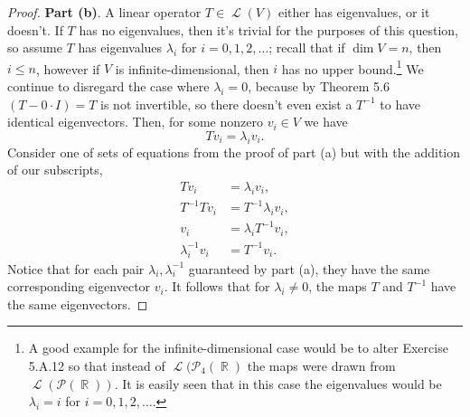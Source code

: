 \documentclass[letterpaper, 12pt]{amsart}
\DeclareMathOperator{\R}{\mathbb{R}}				%
\DeclareMathOperator{\Ell}{\mathscr{L}}				%
\theoremstyle{definition}  							%
\begin{document}
\begin{proof}
		\textbf{Part (b)}.
		A linear operator $T \in \Ell(V)$ either has eigenvalues, or it doesn't.
		If $T$ has no eigenvalues, then it's trivial for the purposes of this question, so assume $T$ has eigenvalues $\lambda_{i}$ for $i = 0, 1, 2, \dots$; recall that if $\dim V = n$, then $i \leq n$, however if $V$ is infinite-dimensional, then $i$ has no upper bound.\footnote{A good example for the infinite-dimensional case would be to alter Exercise 5.A.12 so that instead of $\Ell(\mathcal{P}_{4}(\R)$ the maps were drawn from $\Ell(\mathcal{P}(\R))$. It is easily seen that in this case the eigenvalues would be $\lambda_{i} = i$ for $i = 0,1,2,\dots$.}
		We continue to disregard the case where $\lambda_{i} = 0$, because by Theorem 5.6 $(T - 0 \cdot I) = T$ is not invertible, so there doesn't even exist a $T^{-1}$ to have identical eigenvectors.
		Then, for some nonzero $v_{i} \in V$ we have $$Tv_{i} = \lambda_{i}v_{i}.$$
		Consider one of sets of equations from the proof of part (a) but with the addition of our subscripts,
		\begin{align*}
			Tv_{i} &= \lambda_{i}v_{i}, \\
			T^{-1}Tv_{i} &= T^{-1}\lambda_{i} v_{i}, \\
			v_{i} &= \lambda_{i} T^{-1}v_{i}, \\
			\lambda_{i}^{-1}v_{i} &= T^{-1}v_{i}.
		\end{align*}
		Notice that for each pair $\lambda_{i}, \lambda_{i}^{-1}$ guaranteed by part (a), they have the same corresponding eigenvector $v_{i}$.
		It follows that for $\lambda_{i} \neq 0$, the maps $T$ and $T^{-1}$ have the same eigenvectors.
		\end{proof}
\end{document}
